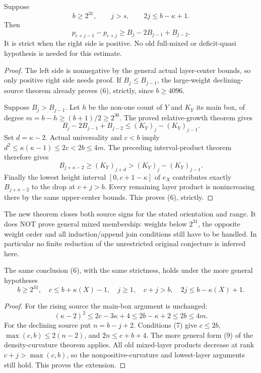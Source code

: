 \begin{theorem}
Suppose
\[
       b\ge2^{31},\qquad j>s,\qquad
                         2j\le b-\kappa+1.
\]
Then
\[
 p_{c+j-1}-p_{c+j}\ge B_j-2B_{j-1}+B_{j-2}.           \tag{6}
\]
It is strict when the right side is positive.
No old full-mixed or deficit-quasi hypothesis is needed for this estimate.
\end{theorem}
\begin{proof}
The left side is nonnegative by the general actual layer-center
bounds, so only positive right side needs proof.
If $B_j\le B_{j-1}$, the large-weight declining-source theorem
already proves (6), strictly, since $b\ge4096$.

Suppose $B_j>B_{j-1}$. Let $h$ be the non-one count of $Y$
and $K_Y$ its main box, of degree $m=b-h\ge(b+1)/2\ge2^{30}$.
The proved relative-growth theorem gives
\[
               B_j-2B_{j-1}+B_{j-2}\le(K_Y)_j-(K_Y)_{j-1}.
\]
Set $d=\kappa-2$. Actual universality and $c<b$ imply
$d^2\le\kappa(\kappa-1)\le2c<2b\le4m$.
The preceding interval-product theorem therefore gives
\[
       B_{j+\kappa-2}\ge(K_Y)_{j+d}
                   >(K_Y)_j-(K_Y)_{j-1}.
\]
Finally the lowest height interval $[0,c+1-\kappa]$ of $e_X$
contributes exactly $B_{j+\kappa-2}$ to the drop at $c+j>b$.
Every remaining layer product is nonincreasing there by the
same upper-center bounds. This proves (6), strictly.
\end{proof}

The new theorem closes both source signs for the stated orientation
and range. It does NOT prove general mixed membership: weights below
$2^{31}$, the opposite weight order and all induction/append join
conditions still have to be handled. In particular no finite reduction
of the unrestricted original conjecture is inferred here.

\begin{theorem}
The same conclusion (6), with the same strictness, holds under
the more general hypotheses
\[
 b\ge2^{31},\quad c\le b+\kappa(X)-1,\quad j\ge1,
 \quad c+j>b,\quad 2j\le b-\kappa(X)+1.               \tag{7}
\]
\end{theorem}
\begin{proof}
For the rising source the main-box argument is unchanged:
\[
 (\kappa-2)^2\le2c-3\kappa+4
                  \le2b-\kappa+2\le2b\le4m.
\]
For the declining source put $n=b-j+2$.
Conditions (7) give
$c\le2b$, $\max(c,b)\le2(n-2)$, and $2n\le c+b+4$.
The more general form (9) of the density-curvature theorem applies.
All old mixed-layer products decrease at rank $c+j>\max(c,b)$,
so the nonpositive-curvature and lowest-layer arguments still hold.
This proves the extension.
\end{proof}
